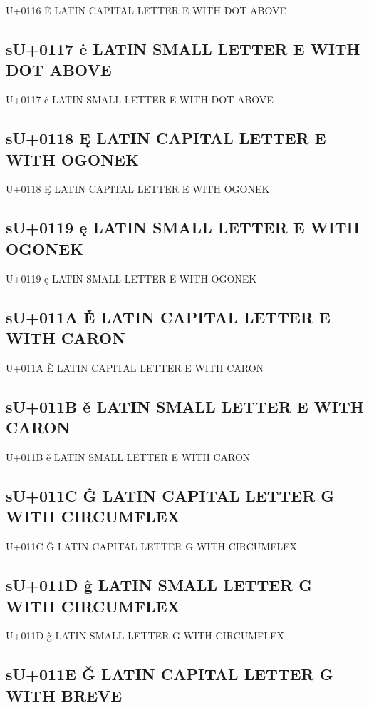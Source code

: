 U+0116 Ė  LATIN CAPITAL LETTER E WITH DOT ABOVE

\subsection{sU+0117 ė  LATIN SMALL LETTER E WITH DOT ABOVE}

U+0117 ė  LATIN SMALL LETTER E WITH DOT ABOVE

\subsection{sU+0118 Ę  LATIN CAPITAL LETTER E WITH OGONEK}

U+0118 Ę  LATIN CAPITAL LETTER E WITH OGONEK

\subsection{sU+0119 ę  LATIN SMALL LETTER E WITH OGONEK}

U+0119 ę  LATIN SMALL LETTER E WITH OGONEK

\subsection{sU+011A Ě  LATIN CAPITAL LETTER E WITH CARON}

U+011A Ě  LATIN CAPITAL LETTER E WITH CARON

\subsection{sU+011B ě  LATIN SMALL LETTER E WITH CARON}

U+011B ě  LATIN SMALL LETTER E WITH CARON

\subsection{sU+011C Ĝ  LATIN CAPITAL LETTER G WITH CIRCUMFLEX}

U+011C Ĝ  LATIN CAPITAL LETTER G WITH CIRCUMFLEX

\subsection{sU+011D ĝ  LATIN SMALL LETTER G WITH CIRCUMFLEX}

U+011D ĝ  LATIN SMALL LETTER G WITH CIRCUMFLEX

\subsection{sU+011E Ğ  LATIN CAPITAL LETTER G WITH BREVE}

